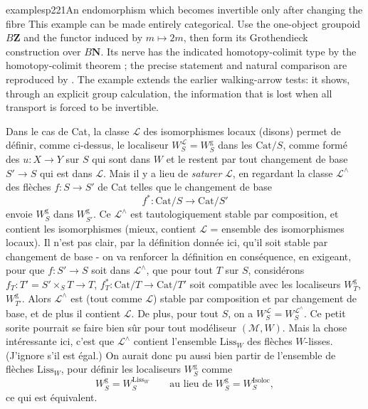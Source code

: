 \begin{dcomment}{examples}{p221}{An endomorphism which becomes invertible only after changing the fibre}
This example can be made entirely categorical. Use the one-object groupoid $B\mathbf Z$ and the functor induced by $m\mapsto2m$, then form its Grothendieck construction over $B\mathbf N$. Its nerve has the indicated homotopy-colimit type by the homotopy-colimit theorem \citep[Theorem 1.2]{Thomason1979}; the precise statement and natural comparison are reproduced by \citet[\S2.3, Theorem 2.6]{Rubin2020Elmendorf}. The example extends the earlier walking-arrow tests: it shows, through an explicit group calculation, the information that is lost when all transport is forced to be invertible.
\end{dcomment}


Dans le cas de Cat, la classe $\mathcal{L}$ des isomorphismes locaux (disons) permet de définir, comme ci-dessus, le localiseur $W^{\mathcal{L}}_S = W^{\mathrm{g}}_S$ dans les $\mathrm{Cat}/S$, comme formé des $u : X \longrightarrow Y$ sur $S$ qui sont dans $W$ et le restent par tout changement de base $S' \longrightarrow S$ qui est dans $\mathcal{L}$. Mais il y a lieu de \textit{saturer} $\mathcal{L}$, en regardant la classe $\mathcal{L}^\wedge$ des flèches $f : S \longrightarrow S'$ de Cat telles que le changement de base
\[
f^* : \mathrm{Cat}/S \longrightarrow \mathrm{Cat}/S'
\]
envoie $W^{\mathrm{g}}_S$ dans $W^{\mathrm{g}}_{S'}$. Ce $\mathcal{L}^\wedge$ est tautologiquement stable par composition, et contient les isomorphismes (mieux, contient $\mathcal{L}$ = ensemble des isomorphismes locaux). Il n'est pas
clair, par la définition donnée ici, qu'il soit stable par changement de base - on va renforcer la définition en conséquence, en exigeant, pour que $f : S' \longrightarrow S$ soit dans $\mathcal{L}^\wedge$, que pour tout $T$ sur $S$, considérons $f_T : T' = S' \times_S T \longrightarrow T$, $f^*_T : \mathrm{Cat}/T \longrightarrow \mathrm{Cat}/T'$ soit compatible avec les localiseurs $W^{\mathrm{g}}_T$, $W^{\mathrm{g}}_{T'}$. Alors $\mathcal{L}^\wedge$ est (tout comme $\mathcal{L}$) stable par composition et par changement de base, et de plus il contient $\mathcal{L}$. De plus, pour tout $S$, on a $W^{\mathcal{L}}_S = W^{\mathcal{L}^\wedge}_S$. Ce petit sorite pourrait se faire bien sûr pour tout modéliseur $(\mathcal{M},W)$. Mais la chose intéressante ici, c'est que $\mathcal{L}^\wedge$ contient l'ensemble $\mathrm{Liss}_W$ des flèches $W$-lisses. (J'ignore s'il est égal.) On aurait donc pu
aussi bien partir de l'ensemble de flèches $\mathrm{Liss}_W$, pour définir les localiseurs $W^{\mathrm{g}}_S$ comme
\[
W^{\mathrm{g}}_S = W^{\mathrm{Liss}_W}_S \qquad \text{au lieu de } W^{\mathrm{g}}_S = W^{\mathrm{Isoloc}}_S,
\]
ce qui est équivalent.

